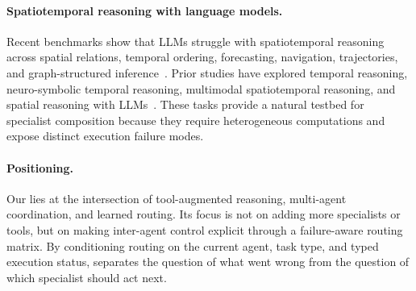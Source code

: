 \paragraph{Spatiotemporal reasoning with language models.}
Recent benchmarks show that LLMs struggle with spatiotemporal reasoning across spatial relations, temporal ordering, forecasting, navigation, trajectories, and graph-structured inference~\citep{quan2025benchmarking,li2025stbench,ni2026streasoner}.
Prior studies have explored temporal reasoning, neuro-symbolic temporal reasoning, multimodal spatiotemporal reasoning, and spatial reasoning with LLMs~\citep{xiong2024large,ge2025tremu,cheng2025v,aghzal2023can, li2026zara}.
These tasks provide a natural testbed for specialist composition because they require heterogeneous computations and expose distinct execution failure modes.

\paragraph{Positioning.}
Our \starname{} lies at the intersection of tool-augmented reasoning, multi-agent coordination, and learned routing.
Its focus is not on adding more specialists or tools, but on making inter-agent control explicit through a failure-aware routing matrix.
By conditioning routing on the current agent, task type, and typed execution status, \starname{} separates the question of what went wrong from the question of which specialist should act next.